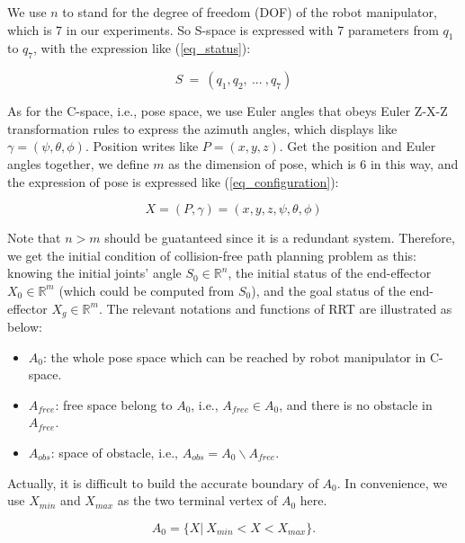 \documentclass[letterpaper, 10 pt, conference]{ieeeconf}  %
\begin{document}
We use $n$ to stand for the degree of freedom (DOF) of the robot manipulator, which is 7 in our experiments. So S-space is expressed with 7 parameters from $q_1$ to $q_7$, with the expression like (\ref{eq_status}):

\begin{equation}
\label{eq_status}
S \ = \ (q_{1}, q_{2}, \ ...  \ , q_{7})
\end{equation}

As for the C-space, i.e., pose space, we use Euler angles that obeys Euler Z-X-Z transformation rules to express the azimuth angles, which displays like $\gamma = (\psi, \theta, \phi)$. Position writes like $P=(x,y,z)$. Get the position and Euler angles together, we define $m$ as the dimension of pose, which is 6 in this way, and the expression of pose is expressed like (\ref{eq_configuration}):

\begin{equation}
\label{eq_configuration}
X = (P,\gamma) = (x,y,z,\psi,\theta,\phi)
\end{equation}

Note that $n > m$ should be guatanteed since it is a redundant system. Therefore, we get the initial condition of collision-free path planning problem as this: knowing the initial joints' angle $S_{0}\in \mathbb{R}^n$, the initial status of the end-effector $X_{0}\in \mathbb{R}^m$ (which could be computed from $S_{0}$), and the goal status of the end-effector $X_{g}\in \mathbb{R}^m$. The relevant notations and functions of RRT are illustrated as below:

\begin{itemize}

\item $A_{0}$: the whole pose space which can be reached by robot manipulator in C-space. 

\item $A_{free}$: free space belong to $A_{0}$, i.e., $A_{free} \in A_{0}$, and there is no obstacle in $A_{free}$.

\item $A_{obs}$: space of obstacle, i.e., $A_{obs} = A_{0}  \backslash A_{free}$.

\end{itemize}

Actually, it is difficult to build the accurate boundary of $A_{0}$. In convenience, we use $X_{min}$ and $X_{max}$ as the two terminal vertex of $A_{0}$ here.

\begin{equation}
A_{0} = \{X|\ X_{min} < X < X_{max}\}.
\label{eq_a0}
\end{equation}
\end{document}
